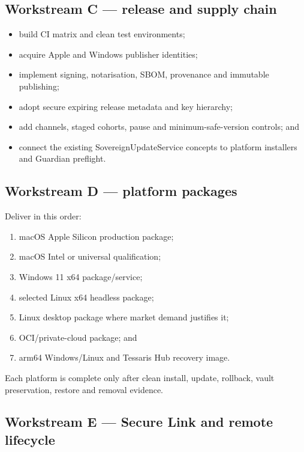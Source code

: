 \documentclass[11pt]{article}
\begin{document}
\subsection{Workstream C --- release and supply chain}

\begin{itemize}
  \item build CI matrix and clean test environments;
  \item acquire Apple and Windows publisher identities;
  \item implement signing, notarisation, SBOM, provenance and immutable publishing;
  \item adopt secure expiring release metadata and key hierarchy;
  \item add channels, staged cohorts, pause and minimum-safe-version controls; and
  \item connect the existing SovereignUpdateService concepts to platform installers and Guardian preflight.
\end{itemize}

\subsection{Workstream D --- platform packages}

Deliver in this order:

\begin{enumerate}
  \item macOS Apple Silicon production package;
  \item macOS Intel or universal qualification;
  \item Windows 11 x64 package/service;
  \item selected Linux x64 headless package;
  \item Linux desktop package where market demand justifies it;
  \item OCI/private-cloud package; and
  \item arm64 Windows/Linux and Tessaris Hub recovery image.
\end{enumerate}

Each platform is complete only after clean install, update, rollback, vault preservation, restore and removal evidence.

\subsection{Workstream E --- Secure Link and remote lifecycle}
\end{document}
